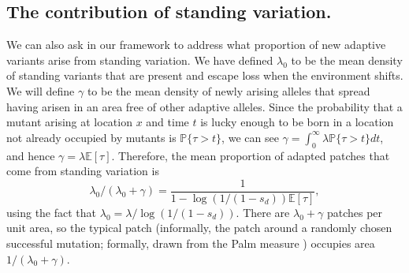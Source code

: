 \documentclass{article}
\renewcommand{\P}{\mathbb{P}}
\newcommand{\E}{\mathbb{E}}
\begin{document}

\subsection{The contribution of standing variation.}
We can also ask in our framework to address what proportion of new adaptive variants arise from standing variation.
We have defined $\lambda_0$ to be the mean density
of standing variants that are present and escape loss when the
environment shifts.
We will define $\gamma$ to be the mean density of newly arising alleles
that spread having arisen in an area free of other adaptive alleles.
Since the probability that a mutant arising at location $x$ and time $t$ 
is lucky enough to be born in a location not already occupied by mutants
is $\P\{ \tau > t \}$,
we can see  $\gamma = \int_0^\infty \lambda \P\{\tau>t\} dt$, and hence
$\gamma = \lambda \E[\tau] $.
Therefore, the mean proportion of adapted patches that come from standing variation
is 
\begin{equation} \label{prop_patches_standing}
\lambda_0 / (\lambda_0 + \gamma)  = \frac{1}{1-\log(1/(1-s_d)) \E[\tau]} ,
\end{equation}
using the fact that $\lambda_0 = \lambda / \log(1/(1-s_d))$.
There are $\lambda_0 + \gamma$ patches per unit area, so
the typical patch (informally, the patch around a randomly chosen
successful mutation; formally, drawn from the Palm measure
\citep{cox1980point}) occupies area $1/(\lambda_0 + \gamma)$. 
\end{document}
